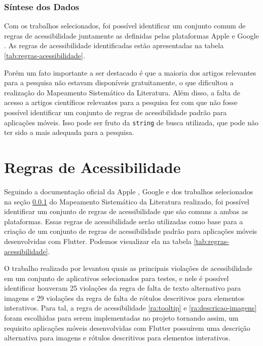 \subsubsection{Síntese dos Dados}\label{sec:sintese-dados}

Com os trabalhos selecionados, foi possível identificar um conjunto comum de regras de acessibilidade juntamente as definidas pelas plataformas Apple \cite{iosaccessibility} e Google \cite{androidaccessibility}. As regras de acessibilidade identificadas estão apresentadas na tabela \ref{tab:regras-acessibilidade}.

Porém um fato importante a ser destacado é que a maioria dos artigos relevantes para a pesquisa não estavam disponíveis gratuitamente, o que dificultou a realização do Mapeamento Sistemático da Literatura. Além disso, a falta de acesso a artigos científicos relevantes para a pesquisa fez com que não fosse possível identificar um conjunto de regras de acessibilidade padrão para aplicações móveis. Isso pode ser fruto da \texttt{string} de busca utilizada, que pode não ter sido a mais adequada para a pesquisa.

\section{Regras de Acessibilidade}\label{sec:regras-acessibilidade}

Seguindo a documentação oficial da Apple \cite[p. ~312]{iosaccessibility}, Google \cite{androidaccessibility} e dos trabalhos selecionados na seção \ref{sec:sintese-dados} do Mapeamento Sistemático da Literatura realizado, foi possível identificar um conjunto de regras de acessibilidade que são comuns a ambas as plataformas. Essas regras de acessibilidade serão utilizadas como base para a criação de um conjunto de regras de acessibilidade padrão para aplicações móveis desenvolvidas com Flutter. Podemos visualizar ela na tabela \ref{tab:regras-acessibilidade}.

O trabalho realizado por \cite{studyofaccessibilityguidelinesofmobileapplications} levantou quais as principais violações de acessibilidade em um conjunto de aplicativos selecionados para testes, e nele é possível identificar houveram 25 violações da regra de falta de texto alternativo para imagens e 29 violações da regra de falta de rótulos descritivos para elementos interativos. Para tal, a regra de acessibilidade \ref{ra:tooltip} e \ref{ra:descricao-imagens} foram escolhidas para serem implementadas no projeto tornando assim, um requisito aplicações móveis desenvolvidas com Flutter possuírem uma descrição alternativa para imagens e rótulos descritivos para elementos interativos.

